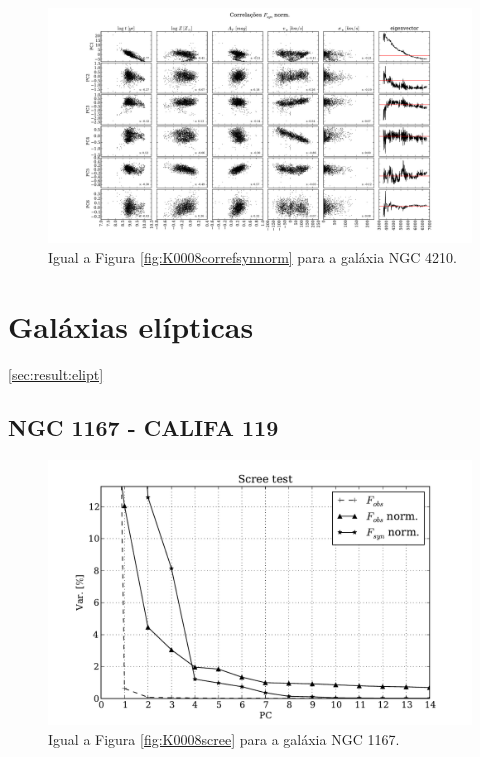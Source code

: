 \begin{figure}
    \includegraphics[width=1.3\textwidth, angle=-90]{figuras/K0518-correl-f_syn_norm-PCvsPhys.pdf}
	\caption[Correlações PCs vs. par\^ametros f\'isicos - $F_{syn}$ norm. - NGC 4210.]
	{Igual a Figura \ref{fig:K0008correfsynnorm} para a galáxia NGC 4210.}
    \label{fig:K0518correfsynnorm}
\end{figure}

\section{Galáxias elípticas}
\ref{sec:result:elipt}

\subsection{NGC 1167 - CALIFA 119}

\begin{figure}
    \includegraphics[height=0.33\textheight]{figuras/K0119-screetest.pdf}
    \caption[Scree test comparativo entre 3 PCAs - NGC 1167.]
    {Igual a Figura \ref{fig:K0008scree} para a galáxia NGC 1167.}
    \label{fig:K0119scree}
\end{figure}

